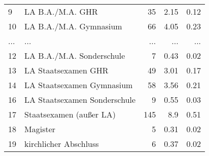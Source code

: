 \begin{longtable}{lXrrr}
        9 & \multicolumn{1}{X}{LA B.A./M.A. GHR} & %
          \num{35} &
          \num[round-mode=places,round-precision=2]{2.15} &
          \num[round-mode=places,round-precision=2]{0.12} \\
        10 & \multicolumn{1}{X}{LA B.A./M.A. Gymnasium} & %
          \num{66} &
          \num[round-mode=places,round-precision=2]{4.05} &
          \num[round-mode=places,round-precision=2]{0.23} \\
       ... & ... & ... & ... & ... \\
        12 & \multicolumn{1}{X}{LA B.A./M.A. Sonderschule} & %
          \num{7} &
          \num[round-mode=places,round-precision=2]{0.43} &
          \num[round-mode=places,round-precision=2]{0.02} \\

        13 & \multicolumn{1}{X}{LA Staatsexamen GHR} & %
          \num{49} &
          \num[round-mode=places,round-precision=2]{3.01} &
          \num[round-mode=places,round-precision=2]{0.17} \\

        14 & \multicolumn{1}{X}{LA Staatsexamen Gymnasium} & %
          \num{58} &
          \num[round-mode=places,round-precision=2]{3.56} &
          \num[round-mode=places,round-precision=2]{0.21} \\

        16 & \multicolumn{1}{X}{LA Staatsexamen Sonderschule} & %
          \num{9} &
          \num[round-mode=places,round-precision=2]{0.55} &
          \num[round-mode=places,round-precision=2]{0.03} \\

        17 & \multicolumn{1}{X}{Staatsexamen (außer LA)} & %
          \num{145} &
          \num[round-mode=places,round-precision=2]{8.9} &
          \num[round-mode=places,round-precision=2]{0.51} \\

        18 & \multicolumn{1}{X}{Magister} & %
          \num{5} &
          \num[round-mode=places,round-precision=2]{0.31} &
          \num[round-mode=places,round-precision=2]{0.02} \\

        19 & \multicolumn{1}{X}{kirchlicher Abschluss} & %
          \num{6} &
          \num[round-mode=places,round-precision=2]{0.37} &
          \num[round-mode=places,round-precision=2]{0.02} \\


\end{longtable}
